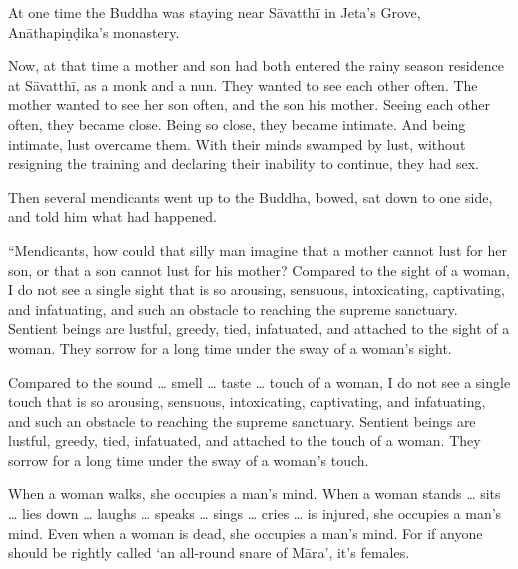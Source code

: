 \documentclass[12pt,openany]{book}%
\begin{document}
At one time the Buddha was staying near \textsanskrit{Sāvatthī} in Jeta’s Grove, \textsanskrit{Anāthapiṇḍika}’s monastery. 

Now, at that time a mother and son had both entered the rainy season residence at \textsanskrit{Sāvatthī}, as a monk and a nun. They wanted to see each other often. The mother wanted to see her son often, and the son his mother. Seeing each other often, they became close. Being so close, they became intimate. And being intimate, lust overcame them. With their minds swamped by lust, without resigning the training and declaring their inability to continue, they had sex. 

Then several mendicants went up to the Buddha, bowed, sat down to one side, and told him what had happened. 

“Mendicants, how could that silly man imagine that a mother cannot lust for her son, or that a son cannot lust for his mother? Compared to the sight of a woman, I do not see a single sight that is so arousing, sensuous, intoxicating, captivating, and infatuating, and such an obstacle to reaching the supreme sanctuary. Sentient beings are lustful, greedy, tied, infatuated, and attached to the sight of a woman. They sorrow for a long time under the sway of a woman’s sight. 

Compared to the sound … smell … taste … touch of a woman, I do not see a single touch that is so arousing, sensuous, intoxicating, captivating, and infatuating, and such an obstacle to reaching the supreme sanctuary. Sentient beings are lustful, greedy, tied, infatuated, and attached to the touch of a woman. They sorrow for a long time under the sway of a woman’s touch. 

When a woman walks, she occupies a man’s mind. When a woman stands … sits … lies down … laughs … speaks … sings … cries … is injured, she occupies a man’s mind. Even when a woman is dead, she occupies a man’s mind. For if anyone should be rightly called ‘an all-round snare of \textsanskrit{Māra}’, it’s females. 
\end{document}
